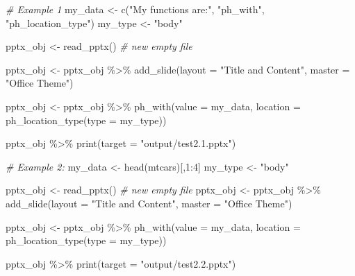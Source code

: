 \documentclass[
]{book}
\newenvironment{Shaded}{\begin{snugshade}}{\end{snugshade}}
\newcommand{\AttributeTok}[1]{\textcolor[rgb]{0.77,0.63,0.00}{#1}}
\newcommand{\CommentTok}[1]{\textcolor[rgb]{0.56,0.35,0.01}{\textit{#1}}}
\newcommand{\DecValTok}[1]{\textcolor[rgb]{0.00,0.00,0.81}{#1}}
\newcommand{\FunctionTok}[1]{\textcolor[rgb]{0.00,0.00,0.00}{#1}}
\newcommand{\NormalTok}[1]{#1}
\newcommand{\OtherTok}[1]{\textcolor[rgb]{0.56,0.35,0.01}{#1}}
\newcommand{\SpecialCharTok}[1]{\textcolor[rgb]{0.00,0.00,0.00}{#1}}
\newcommand{\StringTok}[1]{\textcolor[rgb]{0.31,0.60,0.02}{#1}}
\begin{document}
\begin{Shaded}
\begin{Highlighting}[]
\CommentTok{\# Example 1}
\NormalTok{my\_data }\OtherTok{\textless{}{-}} \FunctionTok{c}\NormalTok{(}\StringTok{"My functions are:"}\NormalTok{, }\StringTok{"ph\_with"}\NormalTok{, }\StringTok{"ph\_location\_type"}\NormalTok{)}
\NormalTok{my\_type }\OtherTok{\textless{}{-}} \StringTok{"body"}

\NormalTok{pptx\_obj }\OtherTok{\textless{}{-}} \FunctionTok{read\_pptx}\NormalTok{() }\CommentTok{\# new empty file}

\NormalTok{pptx\_obj }\OtherTok{\textless{}{-}}\NormalTok{ pptx\_obj }\SpecialCharTok{\%\textgreater{}\%} 
  \FunctionTok{add\_slide}\NormalTok{(}\AttributeTok{layout =} \StringTok{"Title and Content"}\NormalTok{, }\AttributeTok{master =} \StringTok{"Office Theme"}\NormalTok{)}

\NormalTok{pptx\_obj }\OtherTok{\textless{}{-}}\NormalTok{ pptx\_obj }\SpecialCharTok{\%\textgreater{}\%}
  \FunctionTok{ph\_with}\NormalTok{(}\AttributeTok{value =}\NormalTok{ my\_data, }\AttributeTok{location =} \FunctionTok{ph\_location\_type}\NormalTok{(}\AttributeTok{type =}\NormalTok{ my\_type))}

\NormalTok{pptx\_obj }\SpecialCharTok{\%\textgreater{}\%}
  \FunctionTok{print}\NormalTok{(}\AttributeTok{target =} \StringTok{"output/test2.1.pptx"}\NormalTok{) }
\end{Highlighting}
\end{Shaded}

\begin{Shaded}
\begin{Highlighting}[]
\CommentTok{\# Example 2: }
\NormalTok{my\_data }\OtherTok{\textless{}{-}} \FunctionTok{head}\NormalTok{(mtcars)[,}\DecValTok{1}\SpecialCharTok{:}\DecValTok{4}\NormalTok{]}
\NormalTok{my\_type }\OtherTok{\textless{}{-}} \StringTok{"body"}

\NormalTok{pptx\_obj }\OtherTok{\textless{}{-}} \FunctionTok{read\_pptx}\NormalTok{() }\CommentTok{\# new empty file}
\NormalTok{pptx\_obj }\OtherTok{\textless{}{-}}\NormalTok{ pptx\_obj }\SpecialCharTok{\%\textgreater{}\%} 
    \FunctionTok{add\_slide}\NormalTok{(}\AttributeTok{layout =} \StringTok{"Title and Content"}\NormalTok{, }\AttributeTok{master =} \StringTok{"Office Theme"}\NormalTok{)}

\NormalTok{pptx\_obj }\OtherTok{\textless{}{-}}\NormalTok{ pptx\_obj }\SpecialCharTok{\%\textgreater{}\%} 
  \FunctionTok{ph\_with}\NormalTok{(}\AttributeTok{value =}\NormalTok{ my\_data, }\AttributeTok{location =} \FunctionTok{ph\_location\_type}\NormalTok{(}\AttributeTok{type =}\NormalTok{ my\_type)) }

\NormalTok{pptx\_obj }\SpecialCharTok{\%\textgreater{}\%}
  \FunctionTok{print}\NormalTok{(}\AttributeTok{target =} \StringTok{"output/test2.2.pptx"}\NormalTok{) }
\end{Highlighting}
\end{Shaded}
\end{document}
